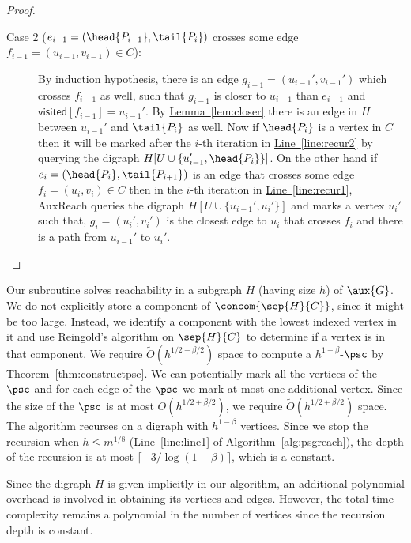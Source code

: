 \documentclass[11pt]{article}
\numberwithin{equation}{section}
\theoremstyle{definition}
\theoremstyle{plain}
\newcommand{\expref}[2]{\hyperref[#2]{#1~\ref{#2}}}
\begin{document}
\begin{proof}
\begin{description}
\item[Case 2 ($e_{i-1} = (\head{P_{i-1}} , \tail{P_{i}})$ crosses some edge $f_{i-1} = (u_{i-1},v_{i-1}) \in C$):] By induction hypothesis, there is an edge $g_{i-1} = (u_{i-1}',v_{i-1}')$ which crosses $f_{i-1}$ as well, such that $g_{i-1}$ is closer to $u_{i-1}$ than $e_{i-1}$ and $\textsf{visited}[f_{i-1}] = u_{i-1}'$. By \expref{Lemma}{lem:closer} there is an edge in $H$ between $u_{i-1}'$ and $\tail{P_{i}}$ as well.
Now if $\head{P_i}$ is a vertex in $C$ then it will be marked after the $i$-th iteration in \expref{Line}{line:recur2} by querying the %
digraph %
 $H[U \cup \{u_{i-1}', \head{P_i}\}]$. On the other hand if $e_i = (\head{P_i} , \tail{P_{i+1}})$ is an edge that crosses some edge $f_i = (u_i,v_i) \in C$ then in the $i$-th iteration in \expref{Line}{line:recur1}, \textsf{AuxReach} queries the %
digraph %
 $H[U \cup \{u_{i-1}', u_i'\}]$ and marks a vertex $u_i'$ such that, $g_i = (u_i',v_i')$ is the closest edge to $u_i$ that crosses $f_i$ and there is a path from $u_{i-1}'$ to $u_i'$.\qedhere\end{description}\end{proof}

Our subroutine %
%
solves  %
reachability in a subgraph $H$ (having size $h$) of $\aux{G}$. We do not explicitly store a component of $\concom{\sep{H}{C}}$, since it might be too large. Instead, we identify a component with the lowest indexed vertex %
 in it and use Reingold's algorithm on $\sep{H}{C}$ to determine if a vertex is %
 in that component. We require $\widetilde{O}(h^{1/2 + \beta/2})$ space to compute a $h^{1-\beta}$-$\psc$ by \expref{Theorem}{thm:constructpsc}. We can potentially mark all the vertices of the $\psc$ and for each edge of
the  %
$\psc$ we mark at most one additional vertex. Since the size of
the  %
$\psc$ is at most $O(h^{1/2 + \beta/2})$, we require $\widetilde{O}(h^{1/2 + \beta/2})$ space. The algorithm recurses on a %
digraph %
 with $h^{1 - \beta}$ vertices.  %
Since we stop the recursion when $h \le m^{1/8}$
(\expref{Line}{line:line1} of \expref{Algorithm}{alg:psgreach}), %
the depth of the recursion is at most
%
$\lceil -3/\log(1-\beta)\rceil$,  %
which is a constant.

Since the %
digraph %
 $H$ is given implicitly in our algorithm, an additional polynomial overhead is involved in obtaining its vertices and edges. However, the total time complexity %
remains  %
a polynomial in the number of vertices since the recursion depth is constant.
\end{document}
